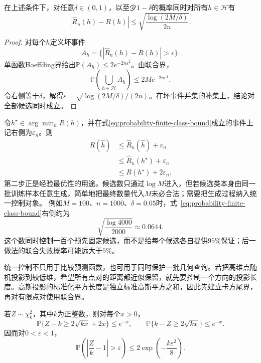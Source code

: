 \begin{theorem}[有限函数类的一致误差界]
\label{thm:probability-finite-class-uniform-bound}
在上述条件下，对任意\(\delta\in(0,1)\)，以至少\(1-\delta\)的概率同时对所有\(h\in\mathcal{H}\)有
\begin{equation}
  |\widehat{R}_n(h)-R(h)|
  \leq
  \sqrt{\frac{\log(2M/\delta)}{2n}}.
  \label{eq:probability-finite-class-bound}
\end{equation}
\end{theorem}

\begin{proof}
对每个\(h\)定义坏事件
\[ A_h=
  \{|\widehat{R}_n(h)-R(h)|>\varepsilon\}. \]
单函数Hoeffding界给出\(\mathbb{P}(A_h)\leq2e^{-2n\varepsilon^2}\)。由联合界，
\[ \mathbb{P}\left(\bigcup_{h\in\mathcal{H}}A_h\right)
  \leq 2M e^{-2n\varepsilon^2}. \]
令右侧等于\(\delta\)，解得\(\varepsilon=\sqrt{\log(2M/\delta)/(2n)}\)。在坏事件并集的补集上，结论对
全部候选同时成立。
\end{proof}

令\(h^\star\in\arg\min_hR(h)\)，并在式\eqref{eq:probability-finite-class-bound}成立的事件上记右侧为\(\varepsilon_n\)。则
\[
\begin{aligned}
  R(\widehat{h})
  &\leq
  \widehat{R}_n(\widehat{h})+\varepsilon_n\\
  &\leq
  \widehat{R}_n(h^\star)+\varepsilon_n\\
  &\leq
  R(h^\star)+2\varepsilon_n.
\end{aligned}
\]
第二步正是经验最优性的用途。候选数只通过\(\log M\)进入，但若候选类本身由同一批训练样本任意生成，简单地把最终数量代入\(M\)未必合法；需要把生成过程纳入统一控制对象。
例如\(M=100\)、\(n=1000\)、\(\delta=0.05\)时，式~\eqref{eq:probability-finite-class-bound}右侧约为
\[
  \sqrt{\frac{\log 4000}{2000}}\approx0.0644.
\]
这个数同时控制一百个预先固定候选，而不是给每个候选各自提供\(95\%\)保证；后一做法的联合失败概率可能远大于\(5\%\)。

统一控制不只用于比较预测函数，也可用于同时保护一批几何查询。若把高维点随机投影到较低维，希望所有点对的距离都近似保留，就先要控制一个方向的投影长度。高斯投影的标准化平方长度是独立标准高斯平方之和，因此先建立卡方尾界，再对有限点对使用联合界。
\begin{lemma}
  \label{lem:probability-chi-square-tail}
  若\(Z\sim\chi_k^2\)，其中\(k\)为正整数，则对每个\(x>0\)，
  \[
    \mathbb{P}\{Z-k\geq2\sqrt{kx}+2x\}\leq e^{-x},
    \qquad
    \mathbb{P}\{k-Z\geq2\sqrt{kx}\}\leq e^{-x}.
  \]
  因而对\(0<\varepsilon<1\)，
  \begin{equation}
    \mathbb{P}\left(
      \left|\frac{Z}{k}-1\right|>\varepsilon
    \right)
    \leq2\exp\left(-\frac{k\varepsilon^2}{8}\right).
    \label{eq:probability-chi-square-relative-tail}
  \end{equation}
\end{lemma}

